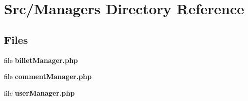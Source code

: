 \section{Src/\+Managers Directory Reference}
\label{dir_539f545fc436bda17edc6f194bdaf790}
\subsection*{Files}
\begin{DoxyCompactItemize}
\item 
file \textbf{ billet\+Manager.\+php}
\item 
file \textbf{ comment\+Manager.\+php}
\item 
file \textbf{ user\+Manager.\+php}
\end{DoxyCompactItemize}
